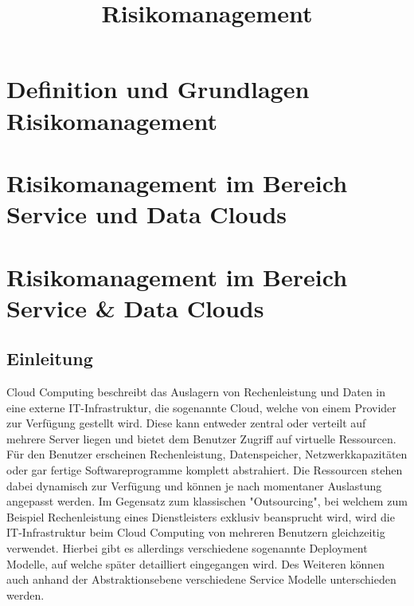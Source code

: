 \documentclass{report}
\begin{document}
\pagestyle{plain}

\title{Risikomanagement}


\maketitle

\tableofcontents
\newpage


\chapter{Definition und Grundlagen Risikomanagement}
\label{sect:grundlagen}






\chapter{Risikomanagement im Bereich Service und Data Clouds}
\label{sect:clouds}
\chapter{Risikomanagement im Bereich Service \& Data Clouds}

\section{Einleitung}
Cloud Computing beschreibt das Auslagern von Rechenleistung und Daten in eine externe IT-Infrastruktur, die sogenannte Cloud, welche von einem Provider zur Verfügung gestellt wird. Diese kann entweder zentral oder verteilt auf mehrere Server liegen und bietet dem Benutzer Zugriff auf virtuelle Ressourcen. Für den Benutzer erscheinen Rechenleistung, Datenspeicher, Netzwerkkapazitäten oder gar fertige Softwareprogramme komplett abstrahiert. Die Ressourcen stehen dabei dynamisch zur Verfügung und können je nach momentaner Auslastung angepasst werden. Im Gegensatz zum klassischen "Outsourcing", bei welchem zum Beispiel Rechenleistung eines Dienstleisters exklusiv beansprucht wird, wird die IT-Infrastruktur beim Cloud Computing von mehreren Benutzern gleichzeitig verwendet. Hierbei gibt es allerdings verschiedene sogenannte Deployment Modelle, auf welche später detailliert eingegangen wird. Des Weiteren können auch anhand der Abstraktionsebene verschiedene Service Modelle unterschieden werden. 
\end{document}
